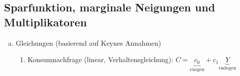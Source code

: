 \documentclass{scrartcl}
\begin{document}
\subsection{Sparfunktion, marginale Neigungen und Multiplikatoren}
\begin{enumerate}[(a)]
\item Gleichungen (basierend auf Keynes Annahmen)
\begin{enumerate}[(1)]
  \item Konsumnachfrage (linear, Verhaltensgleichung): $C=\underbrace{c_{0}}_\text{exogen} + c_1 \underbrace{Y}_\text{endogen}$\\

\end{enumerate}
\end{enumerate}
\end{document}
